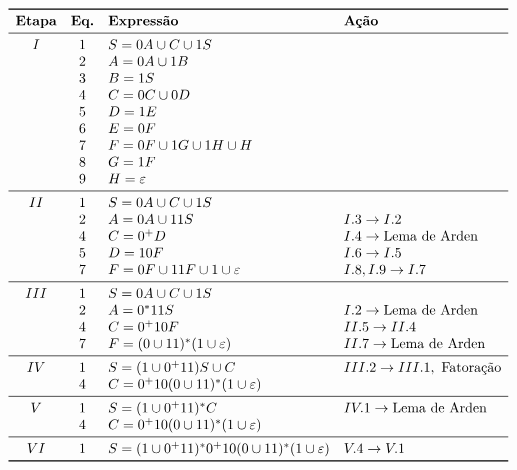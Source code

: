 \documentclass[12pt]{article}
\newcommand{\ve}{\ensuremath{\varepsilon}}
\begin{document}
\begin{tcolorbox}[breakable,rounded corners, colback=yellow!5, colframe=red!40!black, title={Extração de expressão regular $\mathcal{R}_2$ da gramática $G_2$, tal que $\mathcal{L}(\mathcal{R}_2)=\mathcal{L}(G_2)$}]
  $$
  \begin{array}{ccll}
  \toprule
  \textbf{Etapa} & \textbf{Eq.} & \textbf{Expressão} & \textbf{Ação}\\
  \midrule
    I & 1 & S = 0A \cup C \cup 1S        &\\
      & 2 & A = 0A \cup 1B               &\\
      & 3 & B = 1S                       &\\
      & 4 & C = 0C \cup 0D               &\\
      & 5 & D = 1E                       &\\
      & 6 & E = 0F                       &\\
      & 7 & F = 0F \cup 1G \cup 1H \cup H&\\
      & 8 & G = 1F                       &\\
      & 9 & H = \ve                      &\\
  \midrule
   II & 1 & S = 0A \cup C \cup 1S           &\\
      & 2 & A = 0A \cup 11S                 & I.3 \to I.2\\
      & 4 & C = 0^+D                        & I.4 \to \text{Lema de Arden}\\
      & 5 & D = 10F                         & I.6 \to I.5\\
      & 7 & F = 0F \cup 11F \cup 1 \cup \ve & I.8,I.9 \to I.7\\
  \midrule
  III & 1 & S = 0A \cup C \cup 1S         &\\
      & 2 & A = 0^*11S                    & I.2 \to \text{Lema de Arden}\\
      & 4 & C = 0^+10F                    & II.5 \to II.4\\
      & 7 & F = (0 \cup 11)^*(1 \cup \ve) & II.7 \to \text{Lema de Arden}\\
  \midrule
   IV & 1 & S = (1 \cup 0^+11)S \cup C         & III.2 \to III.1,\ \text{Fatoração}\\
      & 4 & C = 0^+10(0 \cup 11)^*(1 \cup \ve) &\\
  \midrule
    V & 1 & S = (1 \cup 0^+11)^*C              & IV.1 \to \text{Lema de Arden}\\
      & 4 & C = 0^+10(0 \cup 11)^*(1 \cup \ve) &\\
  \midrule
   VI & 1 & S = (1 \cup 0^+11)^*0^+10(0 \cup 11)^*(1 \cup \ve) & V.4 \to V.1\\
  \bottomrule
  \end{array}
  $$
\end{tcolorbox}
\end{document}
